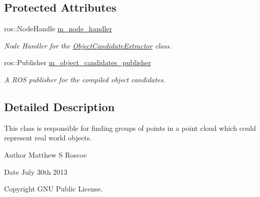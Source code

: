 \subsection*{\-Protected \-Attributes}
\begin{DoxyCompactItemize}
\item 
\hypertarget{class_object_candidate_extractor_a9a0da45687232f96360f76175a3cb097}{ros\-::\-Node\-Handle \hyperlink{class_object_candidate_extractor_a9a0da45687232f96360f76175a3cb097}{m\-\_\-node\-\_\-handler}}\label{class_object_candidate_extractor_a9a0da45687232f96360f76175a3cb097}

\begin{DoxyCompactList}\small\item\em \-Node \-Handler for the \hyperlink{class_object_candidate_extractor}{\-Object\-Candidate\-Extractor} class. \end{DoxyCompactList}\item 
\hypertarget{class_object_candidate_extractor_a3b5cd0451266eafe0aba2d950a7434e8}{ros\-::\-Publisher \hyperlink{class_object_candidate_extractor_a3b5cd0451266eafe0aba2d950a7434e8}{m\-\_\-object\-\_\-candidates\-\_\-publisher}}\label{class_object_candidate_extractor_a3b5cd0451266eafe0aba2d950a7434e8}

\begin{DoxyCompactList}\small\item\em \-A \-R\-O\-S publisher for the compiled object candidates. \end{DoxyCompactList}\end{DoxyCompactItemize}


\subsection{\-Detailed \-Description}
\-This class is responsible for finding groups of points in a point cloud which could represent real world objects. 

\begin{DoxyAuthor}{\-Author}
\-Matthew \-S \-Roscoe 
\end{DoxyAuthor}
\begin{DoxyDate}{\-Date}
\-July 30th 2013 
\end{DoxyDate}
\begin{DoxyCopyright}{\-Copyright}
\-G\-N\-U \-Public \-License. 
\end{DoxyCopyright}


